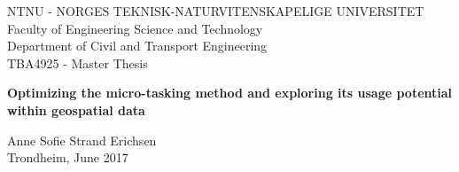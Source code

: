 \begin{titlepage}
\vspace * {-2.5cm}	
	NTNU - NORGES TEKNISK-NATURVITENSKAPELIGE UNIVERSITET\\
	Faculty of Engineering Science and Technology\\
	Department of Civil and Transport Engineering\\
	TBA4925 - Master Thesis
	
\begin{center}

\vspace * {5cm}
\huge \textbf{Optimizing the micro-tasking method and exploring its usage potential within geospatial data}

\vspace * {2cm}

\large
Anne Sofie Strand Erichsen \\ Trondheim, June 2017
\end{center}

\end{titlepage}
